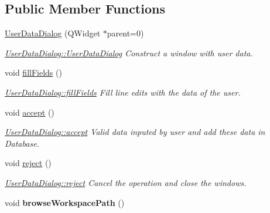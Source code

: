 \subsection*{Public Member Functions}
\begin{DoxyCompactItemize}
\item 
\hyperlink{classGui_1_1Dialogs_1_1UserDataDialog_a3cafa419d49d124e72511a3b91f8ee76}{User\-Data\-Dialog} (Q\-Widget $\ast$parent=0)
\begin{DoxyCompactList}\small\item\em \hyperlink{classGui_1_1Dialogs_1_1UserDataDialog_a3cafa419d49d124e72511a3b91f8ee76}{User\-Data\-Dialog\-::\-User\-Data\-Dialog} Construct a window with user data. \end{DoxyCompactList}\item 
\hypertarget{classGui_1_1Dialogs_1_1UserDataDialog_ae1a17e6547a30b03ba2c837ba0b28455}{void \hyperlink{classGui_1_1Dialogs_1_1UserDataDialog_ae1a17e6547a30b03ba2c837ba0b28455}{fill\-Fields} ()}\label{classGui_1_1Dialogs_1_1UserDataDialog_ae1a17e6547a30b03ba2c837ba0b28455}

\begin{DoxyCompactList}\small\item\em \hyperlink{classGui_1_1Dialogs_1_1UserDataDialog_ae1a17e6547a30b03ba2c837ba0b28455}{User\-Data\-Dialog\-::fill\-Fields} Fill line edits with the data of the user. \end{DoxyCompactList}\item 
\hypertarget{classGui_1_1Dialogs_1_1UserDataDialog_a2d3841c471d0ddfd58610d3667d8521a}{void \hyperlink{classGui_1_1Dialogs_1_1UserDataDialog_a2d3841c471d0ddfd58610d3667d8521a}{accept} ()}\label{classGui_1_1Dialogs_1_1UserDataDialog_a2d3841c471d0ddfd58610d3667d8521a}

\begin{DoxyCompactList}\small\item\em \hyperlink{classGui_1_1Dialogs_1_1UserDataDialog_a2d3841c471d0ddfd58610d3667d8521a}{User\-Data\-Dialog\-::accept} Valid data inputed by user and add these data in Database. \end{DoxyCompactList}\item 
\hypertarget{classGui_1_1Dialogs_1_1UserDataDialog_a919f59546670019bb4e72fcd0c7ea841}{void \hyperlink{classGui_1_1Dialogs_1_1UserDataDialog_a919f59546670019bb4e72fcd0c7ea841}{reject} ()}\label{classGui_1_1Dialogs_1_1UserDataDialog_a919f59546670019bb4e72fcd0c7ea841}

\begin{DoxyCompactList}\small\item\em \hyperlink{classGui_1_1Dialogs_1_1UserDataDialog_a919f59546670019bb4e72fcd0c7ea841}{User\-Data\-Dialog\-::reject} Cancel the operation and close the windows. \end{DoxyCompactList}\item 
\hypertarget{classGui_1_1Dialogs_1_1UserDataDialog_a7516a1eb19fa88dc405c085cefa6a3b6}{void {\bfseries browse\-Workspace\-Path} ()}\label{classGui_1_1Dialogs_1_1UserDataDialog_a7516a1eb19fa88dc405c085cefa6a3b6}

\end{DoxyCompactItemize}


